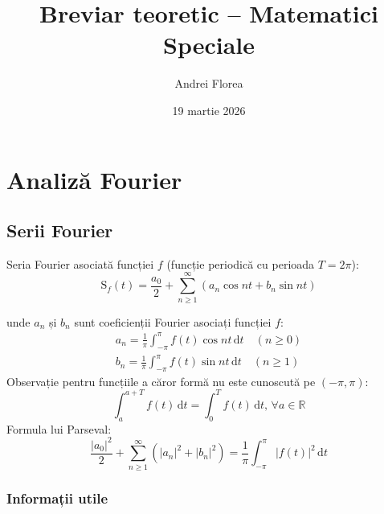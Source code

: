 \documentclass{article}
\title{Breviar teoretic -- Matematici Speciale}
\author{Andrei Florea}
\date{19 martie 2026}
\begin{document}
\maketitle

\section{Analiză Fourier}
\subsection{Serii Fourier}

Seria Fourier asociată funcției $f$ (funcție periodică cu perioada $T=2\pi$):
\begin{displaymath}
    \mathrm{S}_f(t)=\frac{a_0}{2}+\sum_{n\geq1}^\infty (a_n\cos nt+b_n\sin nt)
\end{displaymath}

unde $a_n$ și $b_n$ sunt coeficienții Fourier asociați funcției $f$:
\begin{gather*}
    a_n=\frac{1}{\pi}\int_{-\pi}^\pi{f(t)\cos nt\,\mathrm{d}t}\quad(n\geq0) \\
    b_n=\frac{1}{\pi}\int_{-\pi}^\pi{f(t)\sin nt\,\mathrm{d}t}\quad(n\geq1)
\end{gather*}
Observație pentru funcțiile a căror formă nu este cunoscută pe $(-\pi,\pi)$:
\begin{displaymath}
    \int_a^{a+T}{f(t)\,\mathrm{d}t}=\int_0^T{f(t)\,\mathrm{d}t},\,\forall a\in\mathbb{R}
\end{displaymath}
Formula lui Parseval:
\begin{displaymath}
    \frac{{|a_0|}^2}{2}+\sum_{n\geq1}^\infty ({|a_n|}^2+{|b_n|}^2) = \frac{1}{\pi}\int_{-\pi}^{\pi}{|f(t)|^2\,\mathrm{d}t}
\end{displaymath}

\subsubsection{Informații utile}
\end{document}
